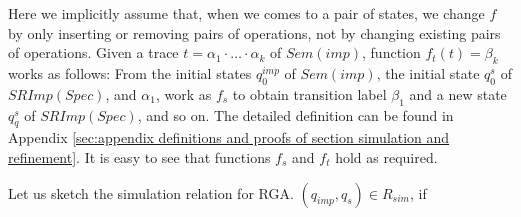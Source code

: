 {Here we implicitly assume that, when we comes to a pair of states, we change $f$ by only inserting or removing pairs of operations, not by changing existing pairs of operations. Given a trace $t = \alpha_1 \cdot \ldots \cdot \alpha_k$ of $\mathit{Sem}(\mathit{imp})$, function $f_t(t) = \beta_k$ works as follows: From the initial states $q_0^{\mathit{imp}}$ of $\mathit{Sem}(\mathit{imp})$, the initial state $q_0^{s}$ of $\mathit{SRImp}(\mathit{Spec})$, and $\alpha_1$, work as $f_s$ to obtain transition label $\beta_1$ and a new state $q_q^{s}$ of $\mathit{SRImp}(\mathit{Spec})$, and so on. The detailed definition can be found in Appendix \ref{sec:appendix definitions and proofs of section simulation and refinement}. It is easy to see that functions $f_s$ and $f_t$ hold as required.
}





Let us sketch the simulation relation for RGA. $(q_{\mathit{imp}},q_s) \in R_{\mathit{sim}}$, if 

